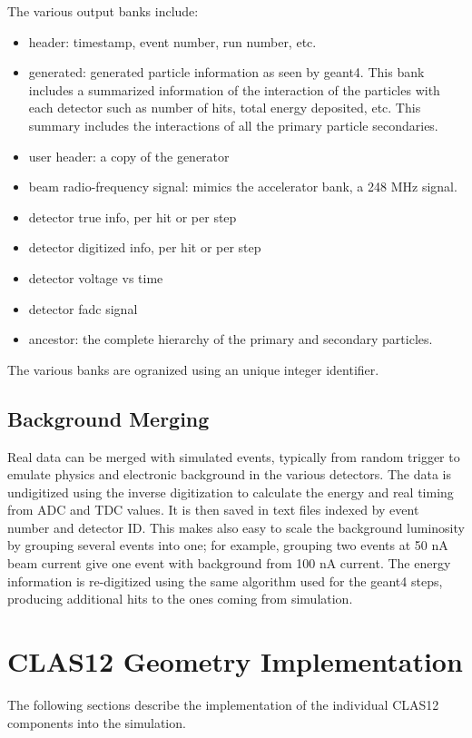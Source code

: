 The various output banks include:

\begin{itemize}
	\item header: timestamp, event number, run number, etc.
	\item generated: generated particle information as seen by geant4. This bank includes a summarized information of the interaction of
                     the particles with each detector such as number of hits, total energy deposited, etc. This summary includes
                     the interactions of all the primary particle secondaries.
	\item user header: a copy of the generator
	\item beam radio-frequency signal: mimics the accelerator bank, a 248 MHz signal.
	\item detector true info, per hit or per step
	\item detector digitized info, per hit or per step
	\item detector voltage vs time
	\item detector fadc signal
\item ancestor: the complete hierarchy of the primary and secondary particles.
\end{itemize}

The various banks are ogranized using an unique integer identifier.

\subsection{Background Merging}

Real data can be merged with simulated events, typically from random trigger to emulate physics and electronic background in
the various detectors.
The data is un\-digitized using the inverse digitization to calculate the energy and real timing from ADC and TDC values.
It is then saved in text files indexed by event number and detector ID. This makes also easy to scale the background luminosity by grouping
several events into one; for example, grouping two events at 50 nA beam current give one event with background from 100 nA current.
The energy information is re-digitized using the same algorithm used for the geant4 steps, producing additional hits to the ones coming from simulation.



\section{CLAS12 Geometry Implementation}

The following sections describe the implementation of the individual CLAS12 components into the simulation.
